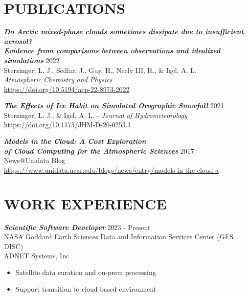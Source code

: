 \documentclass[overlapped]{res}
\begin{document}
\begin{resume}
\section{PUBLICATIONS}

    {\sl \textbf{Do Arctic mixed-phase clouds sometimes dissipate due to insufficient aerosol?\\Evidence from comparisons between observations and idealized simulations}}
    \hfill 2022 \\ Sterzinger, L. J., Sedlar, J., Guy, H., Neely III, R., \& Igel, A. L. \\ \textit{Atmospheric Chemistry and Physics} \\ \href{https://doi.org/10.5194/acp-22-8973-2022}{https://doi.org/10.5194/acp-22-8973-2022}

    {\sl \textbf{The Effects of Ice Habit on Simulated Orographic Snowfall}} 
    \hfill 2021 \\ Sterzinger, L. J., \& Igel, A. L. - \textit{Journal of Hydrometeorology} \\ \href{https://doi.org/10.1175/JHM-D-20-0253.1}{https://doi.org/10.1175/JHM-D-20-0253.1}



    
    {\sl \textbf{Models in the Cloud: A Cost Exploration \\ of Cloud Computing for the Atmospheric Sciences}} \hfill 2017 \\
    News@Unidata Blog \\
    \href{https://www.unidata.ucar.edu/blogs/news/entry/models-in-the-cloud-a}{https://www.unidata.ucar.edu/blogs/news/entry/models-in-the-cloud-a}
    
    
\section{WORK EXPERIENCE} 
    {\sl \textbf{Scientific Software Developer}} \hfill 2023 - Present \\
    NASA Goddard Earth Sciences Data and Information Services Center (GES DISC) \\
    ADNET Systems, Inc \\
    \begin{itemize}
        \item Satellite data curation and on-prem processing
        \item Support transition to cloud-based environment
    \end{itemize}



\end{resume}
\end{document}
